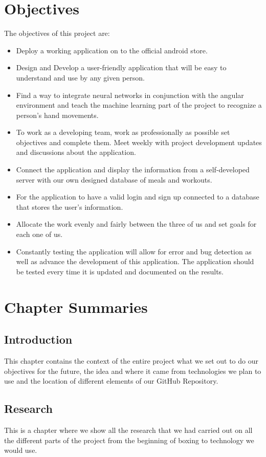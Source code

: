 \documentclass[a4paper,12pt]{report}
\begin{document}
\section{Objectives}
The objectives of this project are:
\begin{itemize}
\item Deploy a working application on to the official android store.
\item Design and Develop a user-friendly application that will be easy to understand and use by any given person.
\item  Find a way to integrate neural networks in conjunction with the angular environment and teach the machine learning part of the project to recognize a person's hand movements.
\item To work as a developing team, work as professionally as possible set objectives and complete them. Meet weekly with project development updates and discussions about the application.  
\item Connect the application and display the information from a self-developed server with our own designed database of meals and workouts.
\item For the application to have a valid login and sign up connected to a database that stores the user's information.
\item Allocate the work evenly and fairly between the three of us and set goals for each one of us.
\item Constantly testing the application will allow for error and bug detection as well as advance the development of this application. The application should be tested every time it is updated and documented on the results.  
\end{itemize}
\newpage
\section{Chapter Summaries}
\subsection{Introduction}
This chapter contains the context of the entire project what we set out to do our objectives for the future, the idea and where it came from technologies we plan to use and the location of different elements of our GitHub Repository. 
\subsection{Research}
This is a chapter where we show all the research that we had carried out on all the different parts of the project from the beginning of boxing to technology we would use.
\end{document}
